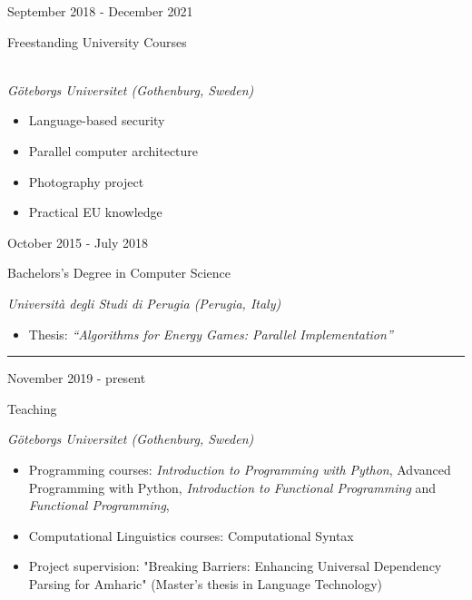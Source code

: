 \documentclass[a4paper,10pt]{article}
\newlength{\cvcolumngapwidth}
\newlength{\cvleftcolumnwidth}
\newlength{\cvrightcolumnwidth}
\newcommand{\cvsectionstyle}[1]{{\normalsize\cvsectionfont\textcolor{cvsectioncolor}{#1}}}
\newcommand{\cvtitlestyle}[1]{{\large\cvtitlefont\textcolor{cvtitlecolor}{#1}}}
\newcommand{\cvdurationstyle}[1]{{\small\cvdurationfont\textcolor{cvdurationcolor}{#1}}}
\newlength{\cvafteritemskipamount}
\newlength{\cvaftersectionskipamount}
\newlength{\cvaftertitleskipamount}
\newlength{\cvparskip}
\newcommand{\cvsection}[1]{
    \begin{minipage}[t]{\cvleftcolumnwidth}
        \raggedleft\cvsectionstyle{#1}
    \end{minipage}%
    \hspace{\cvcolumngapwidth}%
    \begin{minipage}[t]{\cvrightcolumnwidth}
        \textcolor{cvrulecolor}{\rule{\cvrightcolumnwidth}{0.3mm}}
    \end{minipage}

    \vspace{\cvaftersectionskipamount}
}
\newcommand{\cvitem}[2]{
    \begin{minipage}[t]{\cvleftcolumnwidth}
        \raggedleft #1
    \end{minipage}%
    \hspace{\cvcolumngapwidth}%
    \begin{minipage}[t]{\cvrightcolumnwidth}
        \setlength{\parskip}{\cvparskip} #2
    \end{minipage}

    \vspace{\cvafteritemskipamount}
}
\newcommand{\cvtitle}[1]{
    \cvtitlestyle{#1}

    \vspace{\cvaftertitleskipamount}
    \vspace{-\cvparskip}
}
\begin{document}
\cvitem{
    \cvdurationstyle{September 2018 - December 2021}
}{
    \cvtitle{Freestanding University Courses}
    \\
    \textit{Göteborgs Universitet (Gothenburg, Sweden)}
    \begin{itemize}[leftmargin=*]
        \item Language-based security
        \item Parallel computer architecture
        \item Photography project
        \item Practical EU knowledge
    \end{itemize}
}

\cvitem{
    \cvdurationstyle{October 2015 - July 2018}
}{
    \cvtitle{Bachelors's Degree in Computer Science}
    
    \textit{Università degli Studi di Perugia (Perugia, Italy)}

    \begin{itemize}[leftmargin=*]
        \item Thesis: \textit{``Algorithms for Energy Games: Parallel Implementation''}
    \end{itemize}
}


%    


\cvsection{WORK EXPERIENCE}

\cvitem{
    \cvdurationstyle{November 2019 - present}
}{
    \cvtitle{Teaching}

    \textit{Göteborgs Universitet (Gothenburg, Sweden)} \
    \begin{itemize}[leftmargin=*]
    \item Programming courses: \textit{Introduction to Programming with Python}, {Advanced Programming with Python}, \textit{Introduction to Functional Programming} and \textit{Functional Programming}, 
    \item Computational Linguistics courses: Computational Syntax
    \item Project supervision: "Breaking Barriers: Enhancing Universal Dependency Parsing for Amharic" (Master's thesis in Language Technology)
    \end{itemize}
}
\end{document}
